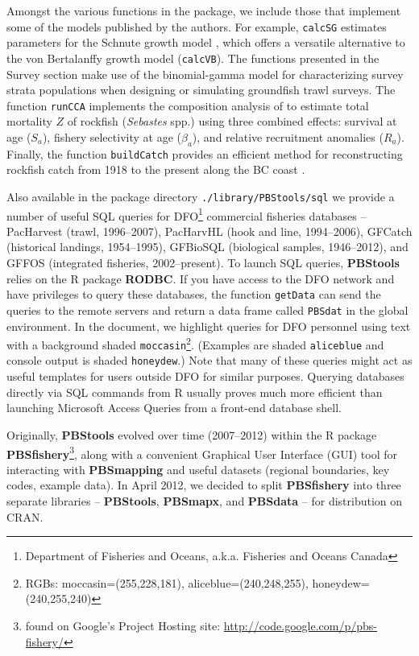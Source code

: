 \documentclass[letterpaper,12pt,fleqn]{article}
\def\tab{\hspace{0.5 in}}
\newcommand{\code}[1]{\small\texttt{#1}\normalsize}
\newcommand{\pkg}[1]{{\bf #1}}
\newcommand{\db}[1]{\small\textmd{\textsf{#1}}\normalsize}
\begin{document}
\tab Amongst the various functions in the package, we include those that implement some of the models published by the authors. For example, \code{calcSG} estimates parameters for the Schnute growth model \citep{Schnute:1981}, which offers a versatile alternative to the von Bertalanffy growth model (\code{calcVB}). The functions presented in the Survey section make use of the binomial-gamma model \citep{Schnute-Haigh:2003} for characterizing survey strata populations when designing or simulating groundfish trawl surveys. The function \code{runCCA} implements the composition analysis of \citet{Schnute-Haigh:2007} to estimate total mortality $Z$ of rockfish (\emph{Sebastes} spp.) using three combined effects: survival at age ($S_a$), fishery selectivity at age ($\beta_a$), and relative recruitment anomalies ($R_a$). Finally, the function \code{buildCatch} provides an efficient method for reconstructing rockfish catch from 1918 to the present along the BC coast \citep{Haigh-Yamanaka:2011}.

\tab Also available in the package directory \code{./library/PBStools/sql} we provide a number of useful SQL queries for DFO\footnote{Department of Fisheries and Oceans, a.k.a. Fisheries and Oceans Canada} commercial fisheries databases -- \db{PacHarvest} (trawl, 1996--2007), \db{PacHarvHL} (hook and line, 1994--2006), \db{GFCatch} (historical landings, 1954--1995), \db{GFBioSQL} (biological samples, 1946--2012), and \db{GFFOS} (integrated fisheries, 2002--present). To launch SQL queries, \pkg{PBStools} relies on the R package \pkg{RODBC}. If you have access to the DFO network and have privileges to query these databases, the function \code{getData} can send the queries to the remote servers and return a data frame called \code{PBSdat} in the global environment. In the document, we highlight queries for DFO personnel using text with a background shaded \code{moccasin}\footnote{RGBs: moccasin=(255,228,181), aliceblue=(240,248,255), honeydew=(240,255,240)}. (Examples are shaded \code{aliceblue} and console output is shaded \code{honeydew}.) Note that many of these queries might act as useful templates for users outside DFO for similar purposes. Querying databases directly via SQL commands from R usually proves much more efficient than launching Microsoft Access Queries from a front-end database shell.

\tab Originally, \pkg{PBStools} evolved over time (2007--2012) within the R package \pkg{PBSfishery}\footnote{found on Google's Project Hosting site: \url{http://code.google.com/p/pbs-fishery/}}, along with a convenient Graphical User Interface (GUI) tool for interacting with \pkg{PBSmapping} and useful datasets (regional boundaries, key codes, example data). In April 2012, we decided to split \pkg{PBSfishery} into three separate libraries -- \pkg{PBStools}, \pkg{PBSmapx}, and \pkg{PBSdata}  -- for distribution on CRAN.
\end{document}
